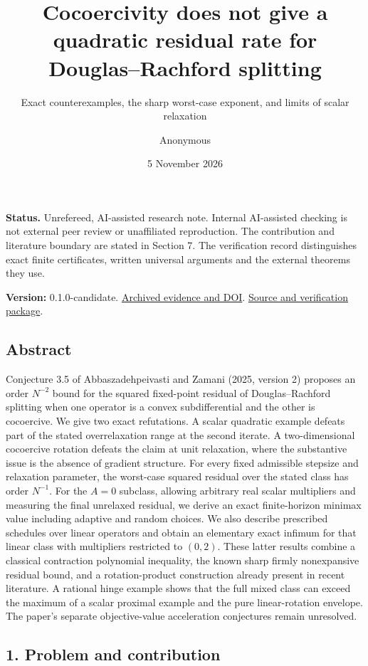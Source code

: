 \documentclass[
  british,
  11pt,
  a4paper,
]{article}
\title{Cocoercivity does not give a quadratic residual rate for
Douglas--Rachford splitting}
\subtitle{Exact counterexamples, the sharp worst-case exponent, and
limits of scalar relaxation}
\author{Anonymous}
\date{5 November 2026}
\newcounter{none} %
\let\oldsubsection\subsection
\renewcommand{\subsection}{\Needspace{5\baselineskip}\oldsubsection}
\begin{document}
\maketitle

\textbf{Status.} Unrefereed, AI-assisted research note. Internal
AI-assisted checking is not external peer review or unaffiliated
reproduction. The contribution and literature boundary are stated in
Section 7. The verification record distinguishes exact finite
certificates, written universal arguments and the external theorems they
use.

\textbf{Version:} 0.1.0-candidate.
\href{https://doi.org/10.5281/zenodo.23990902}{Archived evidence and
DOI}.
\href{https://github.com/ipitchford/douglas-rachford-residual-counterexamples}{Source
and verification package}.

\subsection{Abstract}\label{abstract}

Conjecture 3.5 of Abbaszadehpeivasti and Zamani (2025, version 2)
proposes an order \(N^{-2}\) bound for the squared fixed-point residual
of Douglas--Rachford splitting when one operator is a convex
subdifferential and the other is cocoercive. We give two exact
refutations. A scalar quadratic example defeats part of the stated
overrelaxation range at the second iterate. A two-dimensional cocoercive
rotation defeats the claim at unit relaxation, where the substantive
issue is the absence of gradient structure. For every fixed admissible
stepsize and relaxation parameter, the worst-case squared residual over
the stated class has order \(N^{-1}\). For the \(A=0\) subclass,
allowing arbitrary real scalar multipliers and measuring the final
unrelaxed residual, we derive an exact finite-horizon minimax value
including adaptive and random choices. We also describe prescribed
schedules over linear operators and obtain an elementary exact infimum
for that linear class with multipliers restricted to \((0,2)\). These
latter results combine a classical contraction polynomial inequality,
the known sharp firmly nonexpansive residual bound, and a
rotation-product construction already present in recent literature. A
rational hinge example shows that the full mixed class can exceed the
maximum of a scalar proximal example and the pure linear-rotation
envelope. The paper's separate objective-value acceleration conjectures
remain unresolved.

\subsection{1. Problem and contribution}\label{problem-and-contribution}
\end{document}
